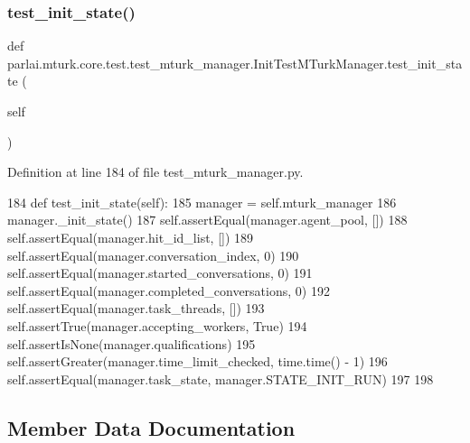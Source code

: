 \subsubsection{\texorpdfstring{test\+\_\+init\+\_\+state()}{test\_init\_state()}}
{\footnotesize\ttfamily def parlai.\+mturk.\+core.\+test.\+test\+\_\+mturk\+\_\+manager.\+Init\+Test\+M\+Turk\+Manager.\+test\+\_\+init\+\_\+state (\begin{DoxyParamCaption}\item[{}]{self }\end{DoxyParamCaption})}



Definition at line 184 of file test\+\_\+mturk\+\_\+manager.\+py.


\begin{DoxyCode}
184     \textcolor{keyword}{def }test\_init\_state(self):
185         manager = self.mturk\_manager
186         manager.\_init\_state()
187         self.assertEqual(manager.agent\_pool, [])
188         self.assertEqual(manager.hit\_id\_list, [])
189         self.assertEqual(manager.conversation\_index, 0)
190         self.assertEqual(manager.started\_conversations, 0)
191         self.assertEqual(manager.completed\_conversations, 0)
192         self.assertEqual(manager.task\_threads, [])
193         self.assertTrue(manager.accepting\_workers, \textcolor{keyword}{True})
194         self.assertIsNone(manager.qualifications)
195         self.assertGreater(manager.time\_limit\_checked, time.time() - 1)
196         self.assertEqual(manager.task\_state, manager.STATE\_INIT\_RUN)
197 
198 
\end{DoxyCode}


\subsection{Member Data Documentation}
\mbox{\label{classparlai_1_1mturk_1_1core_1_1test_1_1test__mturk__manager_1_1InitTestMTurkManager_a5508c8484a1d2ee173b1e8dfab105089}} 
